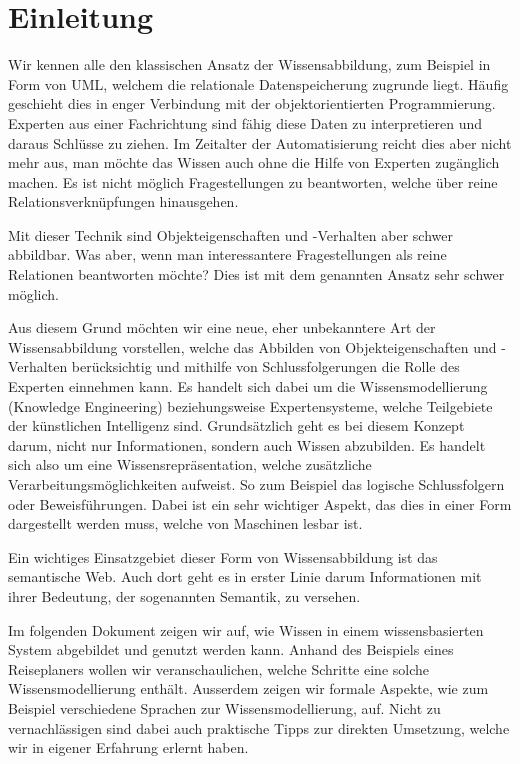 \chapter{Einleitung}
\label{chap:einleitung}
Wir kennen alle den klassischen Ansatz der Wissensabbildung, zum Beispiel in Form von UML, welchem die relationale Datenspeicherung zugrunde liegt. Häufig geschieht dies in enger Verbindung mit der objektorientierten Programmierung. Experten aus einer Fachrichtung sind fähig diese Daten zu interpretieren und daraus Schlüsse zu ziehen. Im Zeitalter der Automatisierung reicht dies aber nicht mehr aus, man möchte das Wissen auch ohne die Hilfe von Experten zugänglich machen. Es ist nicht möglich Fragestellungen zu beantworten, welche über reine Relationsverknüpfungen hinausgehen.


Mit dieser Technik sind Objekteigenschaften und -Verhalten aber schwer abbildbar. Was aber, wenn man interessantere Fragestellungen als reine Relationen beantworten möchte? Dies ist mit dem genannten Ansatz sehr schwer möglich.

Aus diesem Grund möchten wir eine neue, eher unbekanntere Art der Wissensabbildung vorstellen, welche das Abbilden von Objekteigenschaften und -Verhalten berücksichtig und mithilfe von Schlussfolgerungen die Rolle des Experten einnehmen kann. Es handelt sich dabei um die Wissensmodellierung (Knowledge Engineering) beziehungsweise Expertensysteme, welche Teilgebiete der künstlichen Intelligenz sind. Grundsätzlich geht es bei diesem Konzept darum, nicht nur Informationen, sondern auch Wissen abzubilden. Es handelt sich also um eine Wissensrepräsentation, welche zusätzliche Verarbeitungsmöglichkeiten aufweist. So zum Beispiel das logische Schlussfolgern oder Beweisführungen. Dabei ist ein sehr wichtiger Aspekt, das dies in einer Form dargestellt werden muss, welche von  Maschinen lesbar ist.\cite{ISpekOntoGeschichte}

Ein wichtiges Einsatzgebiet dieser Form von Wissensabbildung ist das semantische Web. Auch dort geht es in erster Linie darum Informationen mit ihrer Bedeutung, der sogenannten Semantik, zu versehen.


Im folgenden Dokument zeigen wir auf, wie Wissen in einem wissensbasierten System abgebildet und genutzt werden kann. Anhand des Beispiels eines Reiseplaners wollen wir veranschaulichen, welche Schritte eine solche Wissensmodellierung enthält. Ausserdem zeigen wir formale Aspekte, wie zum Beispiel verschiedene Sprachen zur Wissensmodellierung, auf. Nicht zu vernachlässigen sind dabei auch praktische Tipps zur direkten Umsetzung, welche wir in eigener Erfahrung erlernt haben.

